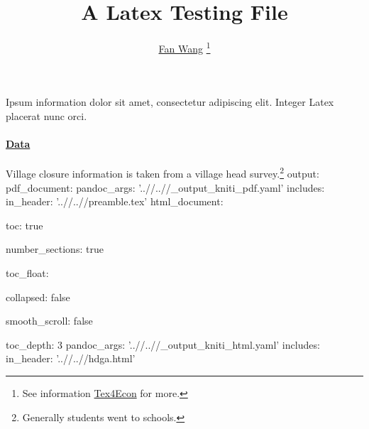 \documentclass[12pt,english]{article}
\begin{document}
\title{A Latex Testing File}
\author{\href{http://fanwangecon.github.io/}{Fan Wang} \thanks{See information \href{https://fanwangecon.github.io/Tex4Econ/}{Tex4Econ} for more.}}
\maketitle
Ipsum information dolor sit amet, consectetur adipiscing elit. Integer Latex placerat nunc orci.
\paragraph{\href{https://papers.ssrn.com/sol3/papers.cfm?abstract_id=3140132}{Data}}
Village closure information is taken from a village head survey.\footnote{Generally students went to schools.}
output:
  pdf_document:
    pandoc_args: '..//..//_output_kniti_pdf.yaml'
    includes:
      in_header: '..//..//preamble.tex'
  html_document:

    toc: true

    number_sections: true

    toc_float:

      collapsed: false

      smooth_scroll: false

      toc_depth: 3
    pandoc_args: '..//..//_output_kniti_html.yaml'
    includes:
      in_header: '..//..//hdga.html'
\end{document}
